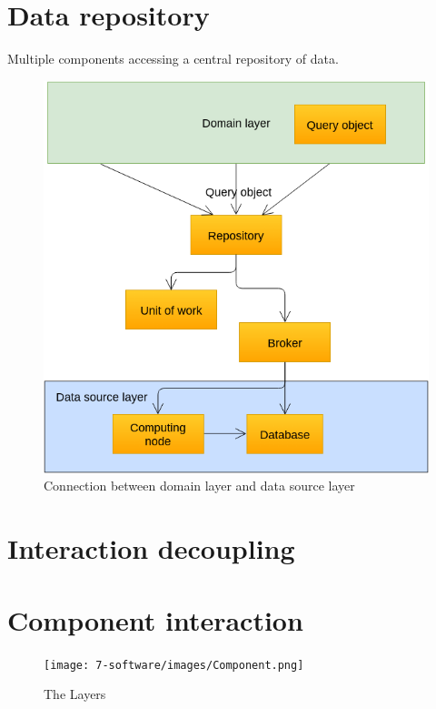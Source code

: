 
\section{Data repository}

Multiple components accessing a central repository of data.

\begin{figure}[H]
\centering
\includegraphics[width=0.8\linewidth]{7-software/images/RepoUowBroker.png}
\caption{Connection between domain layer and data source layer}
\label{fig:frontclasses}
\end{figure}

\section{Interaction decoupling}


\section{Component interaction}

\begin{figure}[H]
\centering
\texttt{[image: 7-software/images/Component.png]}
\caption{The Layers}
\label{fig:layers}
\end{figure}


